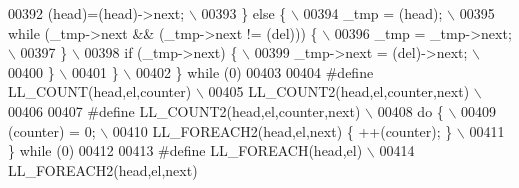 \begin{DoxyCode}
00392 \textcolor{preprocessor}{    (head)=(head)->next;                                                                       \(\backslash\)}
00393 \textcolor{preprocessor}{  \} else \{                                                                                     \(\backslash\)}
00394 \textcolor{preprocessor}{    \_tmp = (head);                                                                             \(\backslash\)}
00395 \textcolor{preprocessor}{    while (\_tmp->next && (\_tmp->next != (del))) \{                                              \(\backslash\)}
00396 \textcolor{preprocessor}{      \_tmp = \_tmp->next;                                                                       \(\backslash\)}
00397 \textcolor{preprocessor}{    \}                                                                                          \(\backslash\)}
00398 \textcolor{preprocessor}{    if (\_tmp->next) \{                                                                          \(\backslash\)}
00399 \textcolor{preprocessor}{      \_tmp->next = (del)->next;                                                                \(\backslash\)}
00400 \textcolor{preprocessor}{    \}                                                                                          \(\backslash\)}
00401 \textcolor{preprocessor}{  \}                                                                                            \(\backslash\)}
00402 \textcolor{preprocessor}{\} while (0)}
00403 
00404 \textcolor{preprocessor}{#define LL\_COUNT(head,el,counter)                                                              \(\backslash\)}
00405 \textcolor{preprocessor}{    LL\_COUNT2(head,el,counter,next)                                                            \(\backslash\)}
00406 \textcolor{preprocessor}{}
00407 \textcolor{preprocessor}{#define LL\_COUNT2(head,el,counter,next)                                                        \(\backslash\)}
00408 \textcolor{preprocessor}{do \{                                                                                           \(\backslash\)}
00409 \textcolor{preprocessor}{  (counter) = 0;                                                                               \(\backslash\)}
00410 \textcolor{preprocessor}{  LL\_FOREACH2(head,el,next) \{ ++(counter); \}                                                   \(\backslash\)}
00411 \textcolor{preprocessor}{\} while (0)}
00412 
00413 \textcolor{preprocessor}{#define LL\_FOREACH(head,el)                                                                    \(\backslash\)}
00414 \textcolor{preprocessor}{    LL\_FOREACH2(head,el,next)}

\end{DoxyCode}
